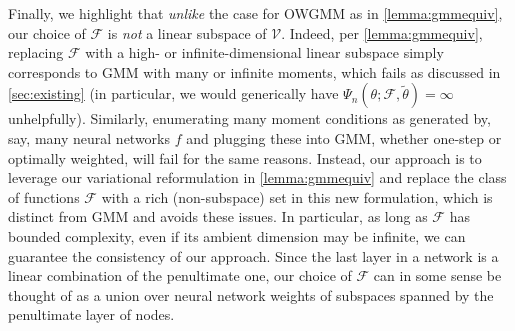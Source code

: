 \documentclass{article}
\theoremstyle{plain}
\theoremstyle{definition}
\begin{document}
Finally, we highlight that \emph{unlike} the case for OWGMM as in \cref{lemma:gmmequiv}, our choice of $\mathcal F$ is \emph{not} a linear subspace of $\mathcal V$. Indeed, per \cref{lemma:gmmequiv}, replacing $\mathcal F$ with a high- or infinite-dimensional linear subspace simply corresponds to GMM with many or infinite moments, which fails as discussed in \cref{sec:existing} (in particular, we would generically have $\Psi_n(\theta;\mathcal F,\tilde\theta)=\infty$ unhelpfully). Similarly, enumerating many moment conditions as generated by, say, many neural networks $f$ and plugging these into GMM, whether one-step or optimally weighted, will fail for the same reasons. Instead, our approach is to leverage our variational reformulation in \cref{lemma:gmmequiv} and replace the class of functions $\mathcal F$ with a rich (non-subspace) set in this new formulation, which is distinct from GMM and avoids these issues. In particular, as long as $\mathcal F$ has bounded complexity, even if its ambient dimension may be infinite, we can guarantee the consistency of our approach. Since the last layer in a network is a linear combination of the penultimate one, our choice of $\mathcal F$ can in some sense be thought of as a union over neural network weights of subspaces spanned by the penultimate layer of nodes.

%


%

%
%
%
%
%
%
%
%
%
%
%
%
%


%



%
%
%

%

%


%



%


%
%
%
%


%


%

%

%
%

%
%
%
%
%
%
%
%
%
%
%
%
%

%

%
%
%
%
%
%
%
%




%
%
%
%
%
%
%
%

%






%


%
%
\end{document}

